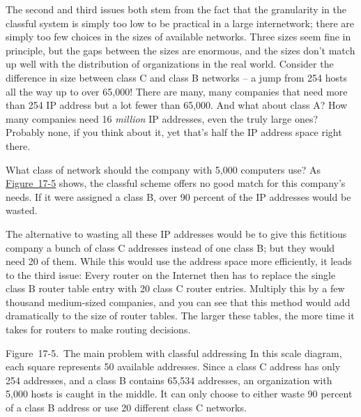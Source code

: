 The second and third issues both stem from the fact that the
\protect\hypertarget{ch17s07.htmlux5cux23idx-CHP-17-0716}{}{}granularity
in the classful system is simply too low to be practical in a large
internetwork; there are simply too few choices in the sizes of available
networks. Three sizes seem fine in principle, but the gaps between the
sizes are enormous, and the sizes don't match up well with the
distribution of organizations in the real world. Consider the difference
in size between class C and class B networks -- a jump from 254 hosts all
the way up to over 65,000! There are many, many companies that need more
than 254 IP address but a lot fewer than 65,000. And what about class A?
How many companies need 16 {\emph{million}} IP addresses, even the truly
large ones? Probably none, if you think about it, yet that's half the IP
address space right there.

What class of network should the company with 5,000 computers use? As
\protect\hyperlink{ch17s07.htmlux5cux23the_main_problem_with_classful_addressin}{Figure~17-5}
shows, the classful scheme offers no good match for this company's
needs. If it were assigned a class B, over 90 percent of the IP
addresses would be wasted.

The alternative to wasting all these IP addresses would be to give this
fictitious company a bunch of class C addresses instead of one class B;
but they would need 20 of them. While this would use the address space
more efficiently, it leads to the third issue: Every router on the
Internet then has to replace the single class B router table entry with
20 class C router entries. Multiply this by a few thousand medium-sized
companies, and you can see that this method would add dramatically to
the size of router tables. The larger these tables, the more time it
takes for routers to make routing decisions.

\protect\hypertarget{ch17s07.htmlux5cux23the_main_problem_with_classful_addressin}{}{}

\protect\hypertarget{ch17s07.htmlux5cux23I_mediaobject3_d1e17980}{}{}

Figure~17-5.~The main problem with classful addressing In this scale
diagram, each square represents 50 available addresses. Since a class C
address has only 254 addresses, and a class B contains 65,534 addresses,
an organization with 5,000 hosts is caught in the middle. It can only
choose to either waste 90 percent of a class B address or use 20
different class C networks.

